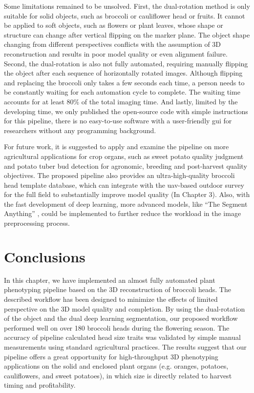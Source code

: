 Some limitations remained to be unsolved. First, the dual-rotation method is only suitable for solid objects, such as broccoli or cauliflower head or fruits. It cannot be applied to soft objects, such as flowers or plant leaves, whose shape or structure can change after vertical flipping on the marker plane. The object shape changing from different perspectives conflicts with the assumption of 3D reconstruction and results in poor model quality or even alignment failure. Second, the dual-rotation is also not fully automated, requiring manually flipping the object after each sequence of horizontally rotated images. Although flipping and replacing the broccoli only takes a few seconds each time, a person needs to be constantly waiting for each automation cycle to complete. The waiting time accounts for at least 80\% of the total imaging time. And lastly, limited by the developing time, we only published the open-source code with simple instructions for this pipeline, there is no easy-to-use software with a user-friendly \gls{gui} for researchers without any programming background.

For future work, it is suggested to apply and examine the pipeline on more agricultural applications for crop organs, such as sweet potato quality judgment and potato tuber bud detection for agronomic, breeding and post-harvest quality objectives. The proposed pipeline also provides an ultra-high-quality broccoli head template database, which can integrate with the \gls{uav}-based outdoor survey for the full field to substantially improve model quality (In Chapter 3). Also, with the fast development of deep learning, more advanced models, like ``The Segment Anything'' \citep{kirillov_segany_2023}, could be implemented to further reduce the workload in the image preprocessing process.

\section{Conclusions}

In this chapter, we have implemented an almost fully automated plant phenotyping pipeline based on the 3D reconstruction of broccoli heads. The described workflow has been designed to minimize the effects of limited perspective on the 3D model quality and completion. By using the dual-rotation of the object and the dual deep learning segmentation, our proposed workflow performed well on over 180 broccoli heads during the flowering season. The accuracy of pipeline calculated head size traits was validated by simple manual measurements using standard agricultural practices. The results suggest that our pipeline offers a great opportunity for high-throughput 3D phenotyping applications on the solid and enclosed plant organs (e.g. oranges, potatoes, cauliflowers, and sweet potatoes), in which size is directly related to harvest timing and profitability.